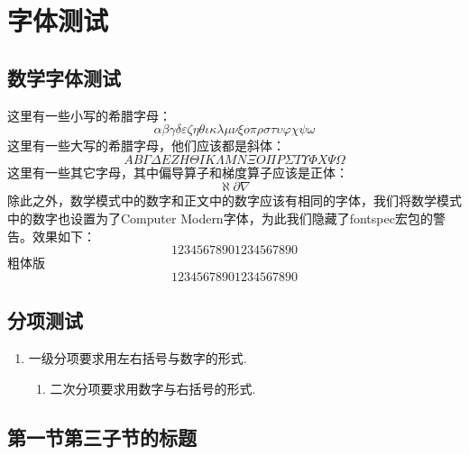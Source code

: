 
\section{字体测试}

\zhlipsum[1]

\subsection{数学字体测试}

这里有一些小写的希腊字母：
\begin{equation}
  \alpha \beta \gamma \delta \varepsilon \zeta \eta \theta \iota \kappa \lambda \mu \nu \xi o \pi \rho \sigma \tau \upsilon \varphi \chi \psi \omega
\end{equation}
这里有一些大写的希腊字母，他们应该都是斜体：
\begin{equation}
  A B \Gamma \Delta E Z H \Theta I K \Lambda M N \Xi O \Pi P \Sigma T \Upsilon \varPhi X \Psi \Omega
\end{equation}
这里有一些其它字母，其中偏导算子和梯度算子应该是正体：
\begin{equation}
  \aleph \partial \nabla
\end{equation}
除此之外，数学模式中的数字和正文中的数字应该有相同的字体，我们将数学模式中的数字也设置为了Computer Modern字体，为此我们隐藏了fontspec宏包的警告。效果如下：
\begin{equation}
  1234567890\text{1234567890}
\end{equation}
粗体版{\bf
  \begin{equation}
    1234567890\text{1234567890}
  \end{equation}
}

\subsection{分项测试}

\begin{enumerate}
  \item 一级分项要求用左右括号与数字的形式.
  \begin{enumerate}
    \item 二次分项要求用数字与右括号的形式.
  \end{enumerate}
\end{enumerate}

\zhlipsum[1]

\subsection{第一节第三子节的标题}

\zhlipsum
